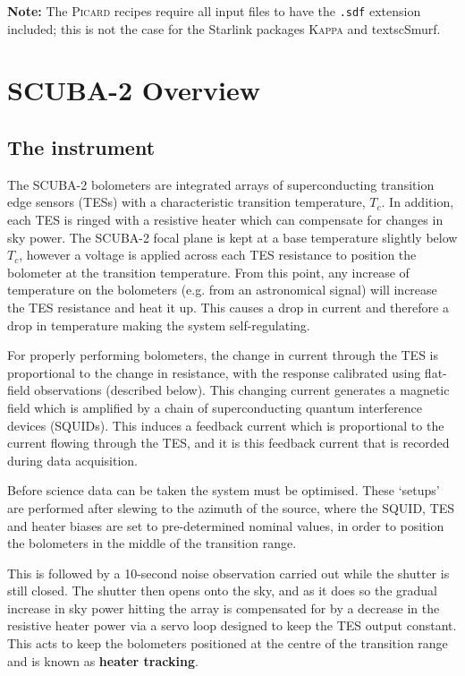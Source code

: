 \documentclass[twoside,11pt]{article}
\newcommand{\xlabel}[1]{}
\renewcommand{\_}{\texttt{\symbol{95}}}
\begin{document}
\textbf{Note:} The \textsc{Picard} recipes require all input files to have
the \texttt{.sdf} extension included; this is not the case for the
Starlink packages \textsc{Kappa} and textsc{Smurf}.

\clearpage
\section{\xlabel{scuba2_overview}SCUBA-2 Overview}
\subsection{\xlabel{scuba2}The instrument}
\label{sec:s2}

The SCUBA-2 bolometers are integrated arrays of superconducting
transition edge sensors (TESs) with a characteristic transition
temperature, $T_c$. In addition, each TES is ringed with a resistive
heater which can compensate for changes in sky power. The SCUBA-2
focal plane is kept at a base temperature slightly below $T_c$,
however a voltage is applied across each TES resistance to position
the bolometer at the transition temperature.  From this point, any
increase of temperature on the bolometers (e.g. from an astronomical
signal) will increase the TES resistance and heat it up. This causes a
drop in current and therefore a drop in temperature making the system
self-regulating.

For properly performing bolometers, the change in current through the
TES is proportional to the change in resistance, with the response
calibrated using flat-field observations (described below). This
changing current generates a magnetic field which is amplified by a
chain of superconducting quantum interference devices (SQUIDs). This
induces a feedback current which is proportional to the current
flowing through the TES, and it is this feedback current that is
recorded during data acquisition.

Before science data can be taken the system must be optimised. These
`setups' are performed after slewing to the azimuth of the source,
where the SQUID, TES and heater biases are set to pre-determined
nominal values, in order to position the bolometers in the middle of
the transition range.

This is followed by a 10-second noise observation carried out while
the shutter is still closed. The shutter then opens onto the sky, and
as it does so the gradual increase in sky power hitting the array is
compensated for by a decrease in the resistive heater power via a
servo loop designed to keep the TES output constant. This acts to keep
the bolometers positioned at the centre of the transition range and is
known as \textbf{heater tracking}.
\end{document}
